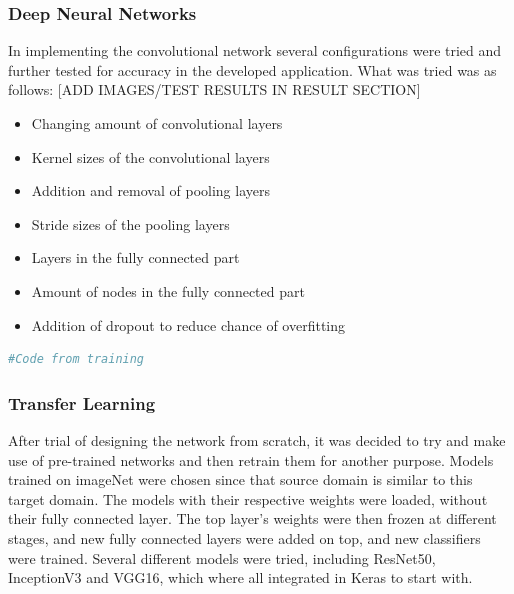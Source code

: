 \subsubsection{Deep Neural Networks}
In implementing the convolutional network several configurations were tried and further tested for accuracy in the developed application. What was tried was as follows:
[ADD IMAGES/TEST RESULTS IN RESULT SECTION]

\begin{itemize}
\item Changing amount of convolutional layers
\item Kernel sizes of the convolutional layers
\item Addition and removal of pooling layers
\item Stride sizes of the pooling layers
\item Layers in the fully connected part
\item Amount of nodes in the fully connected part
\item Addition of dropout to reduce chance of overfitting 
\end{itemize}

\begin{lstlisting}[language=python]
#Code from training 

\end{lstlisting}

\subsubsection{Transfer Learning}
After trial of designing the network from scratch, it was decided to try and make use of pre-trained networks and then retrain them for another purpose. Models trained on imageNet \cite{imageNet} were chosen since that source domain is similar to this target domain. The models with their respective weights were loaded, without their fully connected layer. The top layer's weights were then frozen at different stages, and new fully connected layers were added on top, and new classifiers were trained. 
Several different models were tried, including ResNet50, InceptionV3 and VGG16, which where all integrated in Keras to start with.

